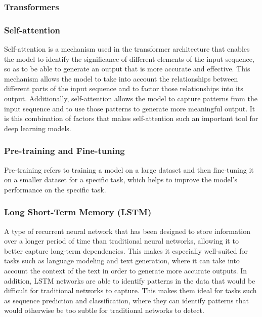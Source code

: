 \subsubsection{Transformers}



\subsubsection{Self-attention}

Self-attention\cite{https://doi.org/10.48550/arxiv.1706.03762} is a mechanism used in the transformer architecture that enables the model to identify the significance of different elements of the input sequence, so as to be able to generate an output that is more accurate and effective. This mechanism allows the model to take into account the relationships between different parts of the input sequence and to factor those relationships into its output. Additionally, self-attention allows the model to capture patterns from the input sequence and to use those patterns to generate more meaningful output. It is this combination of factors that makes self-attention such an important tool for deep learning models.

\subsubsection{Pre-training and Fine-tuning}

Pre-training refers to training a model on a large dataset and then fine-tuning it on a smaller dataset for a specific task, which helps to improve the model's performance on the specific task.

\subsubsection{Long Short-Term Memory (LSTM)}

A type of recurrent neural network that has been designed to store information over a longer period of time than traditional neural networks, allowing it to better capture long-term dependencies\cite{Hochreiter1997LongSM}.
This makes it especially well-suited for tasks such as language modeling and text generation, where it can take into account the context of the text in order to generate more accurate outputs.
In addition, LSTM networks are able to identify patterns in the data that would be difficult for traditional networks to capture. This makes them ideal for tasks such as sequence prediction and classification, where they can identify patterns that would otherwise be too subtle for traditional networks to detect.


